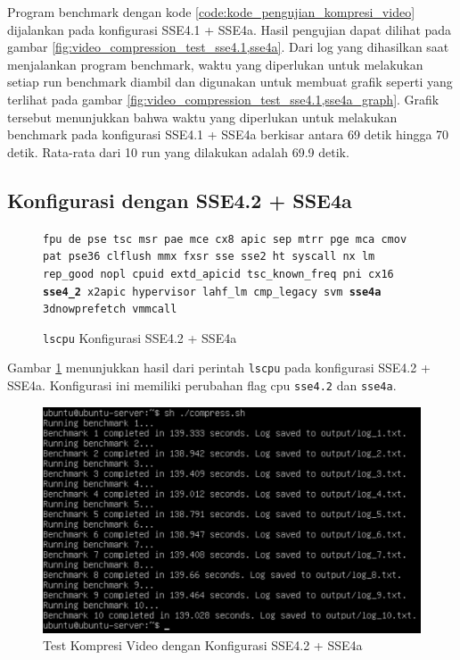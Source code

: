 Program benchmark dengan kode \ref{code:kode_pengujian_kompresi_video} dijalankan pada konfigurasi SSE4.1 + SSE4a. Hasil pengujian dapat dilihat pada gambar \ref{fig:video_compression_test_sse4.1,sse4a}. Dari log yang dihasilkan saat menjalankan program benchmark, waktu yang diperlukan untuk melakukan setiap run benchmark diambil dan digunakan untuk membuat grafik seperti yang terlihat pada gambar \ref{fig:video_compression_test_sse4.1,sse4a_graph}. Grafik tersebut menunjukkan bahwa waktu yang diperlukan untuk melakukan benchmark pada konfigurasi SSE4.1 + SSE4a berkisar antara 69 detik hingga 70 detik. Rata-rata dari 10 run yang dilakukan adalah 69.9 detik.

\subsection{Konfigurasi dengan SSE4.2 + SSE4a}
\begin{figure}
    \texttt{fpu de pse tsc msr pae mce cx8 apic sep mtrr pge mca cmov pat pse36 clflush mmx fxsr sse sse2 ht syscall nx lm rep\_good nopl cpuid extd\_apicid tsc\_known\_freq pni cx16 \textbf{sse4\_2} x2apic hypervisor lahf\_lm cmp\_legacy svm \textbf{sse4a} 3dnowprefetch vmmcall}
    \caption{\texttt{lscpu} Konfigurasi SSE4.2 + SSE4a}
    \label{fig:lscpu_video_compression_test_sse4.2,sse4a}
\end{figure}

Gambar \ref{fig:lscpu_video_compression_test_sse4.2,sse4a} menunjukkan hasil dari perintah \texttt{lscpu} pada konfigurasi SSE4.2 + SSE4a. Konfigurasi ini memiliki perubahan flag cpu \texttt{sse4.2} dan \texttt{sse4a}.

\begin{figure}
    \centering
    \includegraphics[width=1\textwidth]
    {assets/pics/video-compression-test/sse4.2,sse4a.jpeg}
    \caption{Test Kompresi Video dengan Konfigurasi SSE4.2 + SSE4a}
    \label{fig:video_compression_test_sse4.2,sse4a}
\end{figure}

